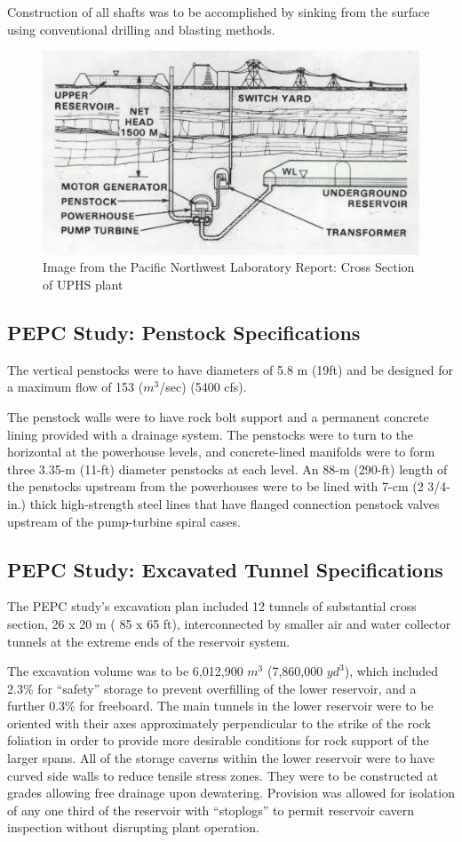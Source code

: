 \documentclass[hidelinks,12pt,a4paper]{article}
\begin{document}
Construction of all shafts was to be accomplished by sinking from the surface using conventional drilling and blasting methods.

\begin{figure}[ht!]
    \centering
    \includegraphics[width=.75\textwidth]{pnl-report-diagram-1.png}
    \caption{Image from the Pacific Northwest Laboratory Report: Cross Section of UPHS plant \cite{UndergroundPumpedHydroelectricStorage}}
\end{figure}
\FloatBarrier

\subsection{PEPC Study: Penstock Specifications}
The vertical penstocks were to have diameters of 5.8 m (19ft) and be designed for a maximum flow of 153 ($m^3$/sec) (5400 cfs).

The penstock walls were to have rock bolt support and a permanent concrete lining provided with a drainage system. The penstocks were to turn to the horizontal at the powerhouse levels, and concrete-lined manifolds were to form three 3.35-m (11-ft) diameter penstocks at each level. An 88-m (290-ft) length of the penstocks upstream from the powerhouses were to be lined with 7-cm (2 3/4-in.) thick high-strength steel lines that have flanged connection penstock valves upstream of the pump-turbine spiral cases.

\subsection{PEPC Study: Excavated Tunnel Specifications}
The PEPC study's excavation plan included 12 tunnels of substantial cross section, 26 x 20 m ( 85 x 65 ft), interconnected by smaller air and water collector tunnels at the extreme ends of the reservoir system.

The excavation volume was to be 6,012,900 $m^3$ (7,860,000 $yd^3$), which included 2.3\% for “safety” storage to prevent overfilling of the lower reservoir, and a further 0.3\% for freeboard. The main tunnels in the lower reservoir were to be oriented with their axes approximately perpendicular to the strike of the rock foliation in order to provide more desirable conditions for rock support of the larger spans. All of the storage caverns within the lower reservoir were to have curved side walls to reduce tensile stress zones. They were to be constructed at grades allowing free drainage upon dewatering. Provision was allowed for isolation of any one third of the reservoir with “stoplogs” to permit reservoir cavern inspection without disrupting plant operation.
\end{document}
